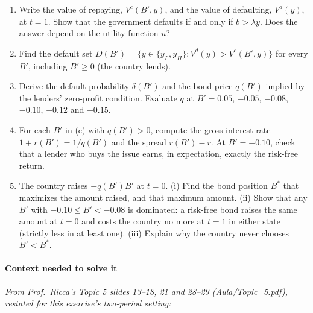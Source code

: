 \documentclass[11pt,a4paper]{article}
\begin{document}
\begin{enumerate}
\def\labelenumi{(\alph{enumi})}
\item
  Write the value of repaying, \(V^c(B', y)\), and the value of defaulting, \(V^d(y)\), at
  \(t = 1\). Show that the government defaults if and only if \(b > \lambda y\). Does the answer
  depend on the utility function \(u\)?
\item
  Find the default set \(D(B') = \{y \in \{y_L, y_H\} : V^d(y) > V^c(B', y)\}\) for every \(B'\),
  including \(B' \ge 0\) (the country lends).
\item
  Derive the default probability \(\delta(B')\) and the bond price \(q(B')\) implied by the lenders'
  zero-profit condition. Evaluate \(q\) at \(B' = 0.05\), \(-0.05\), \(-0.08\), \(-0.10\), \(-0.12\)
  and \(-0.15\).
\item
  For each \(B'\) in (c) with \(q(B') > 0\), compute the gross interest rate \(1 + r(B') = 1/q(B')\)
  and the spread \(r(B') - r\). At \(B' = -0.10\), check that a lender who buys the issue earns, in
  expectation, exactly the risk-free return.
\item
  The country raises \(-q(B')B'\) at \(t = 0\). (i) Find the bond position \(B^*\) that maximizes
  the amount raised, and that maximum amount. (ii) Show that any \(B'\) with
  \(-0.10 \le B' < -0.08\) is dominated: a risk-free bond raises the same amount at \(t = 0\) and
  costs the country no more at \(t = 1\) in either state (strictly less in at least one). (iii)
  Explain why the country never chooses \(B' < B^*\).
\end{enumerate}

\paragraph{Context needed to solve it}

\emph{From Prof.~Ricca's Topic 5 slides 13--18, 21 and 28--29 (Aula/Topic\_5.pdf), restated for this
exercise's two-period setting:}
\end{document}
